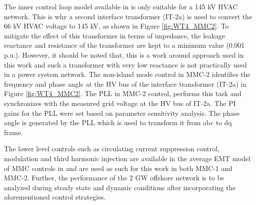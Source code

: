 The inner control loop model available in \cite{vrana2013cigre} is only suitable for a 145 kV \gls{HVAC} network. This is why a second interface transformer (IT-2a) is used to convert the 66 kV \gls{HVAC} voltage to 145 kV, as shown in Figure \ref{fig:WT4_MMC2}. To mitigate the effect of this transformer in terms of impedance, the leakage reactance and resistance of the transformer are kept to a minimum value (0.001 p.u.). However, it should be noted that, this is a work around approach used in this work and such a transformer with very low reactance is not practically used in a power system network. The non-island mode control in \gls{MMC}-2 identifies the frequency and phase angle at the \gls{HV} bus of the interface transformer (IT-2a) in Figure \ref{fig:WT4_MMC2}. The \gls{PLL} in \gls{MMC}-2 control, performs this task and synchronizes with the measured grid voltage at the \gls{HV} bus of IT-2a. The \gls{PI} gains for the \gls{PLL} were set based on parameter sensitivity analysis. The phase angle is generated by the \gls{PLL} which is used to transform it from abc to \gls{dq} frame.

The lower level controls such as circulating current suppression control, modulation and third harmonic injection %
are available in the average \gls{EMT} model of \gls{MMC} controls in \cite{vrana2013cigre} and are used as such for this work in both \gls{MMC}-1 and \gls{MMC}-2. Further, the performance of the 2 GW offshore network is to be analyzed during steady state and dynamic conditions after incorporating the aforementioned control strategies.

